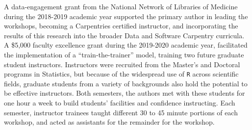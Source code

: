 \documentclass[12pt]{article}
\begin{document}
\quad A data-engagement grant from the National Network of Libraries of Medicine
during the 2018-2019 academic year supported the primary author in leading the
workshops, becoming a Carpentries certified instructor, and incorporating the
results of this research into the broader Data and Software Carpentry curricula.
A \$5,000 faculty excellence grant during the 2019-2020 academic year,
facilitated the implementation of a ``train-the-trainer'' model, training two 
future graduate student instructors. Instructors were recruited from the
Master's and Doctoral programs in Statistics, but because of the widespread use
of \texttt{R} across scientific fields, graduate students from a variety of
backgrounds also hold the potential to be effective instructors. Both semesters,
the authors met with these students for one hour a week to build students'
facilities and confidence instructing. Each semester, instructor trainees taught
different 30 to 45 minute portions of each workshop, and acted as assistants for
the remainder for the workshop.  

\end{document}
